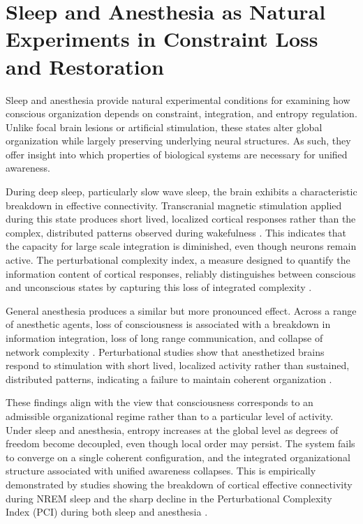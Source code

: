 \documentclass[12pt,letterpaper]{article}
\begin{document}
\section{Sleep and Anesthesia as Natural Experiments in Constraint Loss and Restoration}

Sleep and anesthesia provide natural experimental conditions for examining how conscious organization depends on constraint, integration, and entropy regulation. Unlike focal brain lesions or artificial stimulation, these states alter global organization while largely preserving underlying neural structures. As such, they offer insight into which properties of biological systems are necessary for unified awareness.

During deep sleep, particularly slow wave sleep, the brain exhibits a characteristic breakdown in effective connectivity. Transcranial magnetic stimulation applied during this state produces short lived, localized cortical responses rather than the complex, distributed patterns observed during wakefulness \cite{massimini2005}. This indicates that the capacity for large scale integration is diminished, even though neurons remain active. The perturbational complexity index, a measure designed to quantify the information content of cortical responses, reliably distinguishes between conscious and unconscious states by capturing this loss of integrated complexity \cite{casali2013}.

General anesthesia produces a similar but more pronounced effect. Across a range of anesthetic agents, loss of consciousness is associated with a breakdown in information integration, loss of long range communication, and collapse of network complexity \cite{alkire2008, sanders2012}. Perturbational studies show that anesthetized brains respond to stimulation with short lived, localized activity rather than sustained, distributed patterns, indicating a failure to maintain coherent organization \cite{casali2013}.

These findings align with the view that consciousness corresponds to an admissible organizational regime rather than to a particular level of activity. Under sleep and anesthesia, entropy increases at the global level as degrees of freedom become decoupled, even though local order may persist. The system fails to converge on a single coherent configuration, and the integrated organizational structure associated with unified awareness collapses. This is empirically demonstrated by studies showing the breakdown of cortical effective connectivity during NREM sleep \cite{massimini2005} and the sharp decline in the Perturbational Complexity Index (PCI) during both sleep and anesthesia \cite{casali2013, casarotto2016}.
\end{document}
